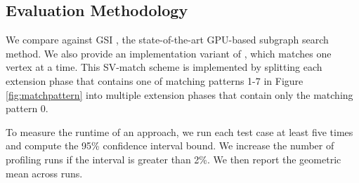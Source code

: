 \subsection{Evaluation Methodology}
 We compare \SystemName against GSI \cite{zeng2020gsi}, the state-of-the-art GPU-based subgraph search
method. We also provide an implementation variant of \SystemName, which matches one vertex at a time. This SV-match scheme is implemented
by splitting each extension phase that contains one of matching patterns 1-7 in Figure \ref {fig:matchpattern} into multiple extension
phases that contain only the matching pattern 0.

 To measure the runtime of an approach, we run each test case at least five times and compute the 95\%
confidence interval bound. We increase the number of profiling runs if the interval is greater than 2\%. We then report the geometric mean
across runs.
